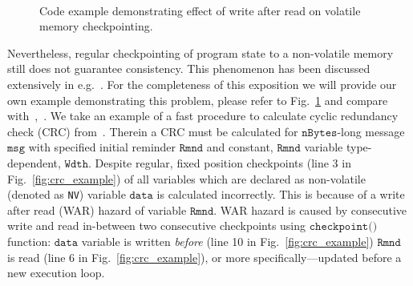 \begin{figure}
	\centering
	\\
	\caption{Code example demonstrating effect of write after read on volatile memory checkpointing.}
	\label{fig:code_demo_incosistency}
\end{figure}

Nevertheless, regular checkpointing of program state to a non-volatile memory still does not guarantee consistency. This phenomenon has been discussed extensively in e.g.~\cite{chain,alpaca}. For the completeness of this exposition we will provide our own example demonstrating this problem, please refer to Fig.~\ref{fig:code_demo_incosistency} and compare with~\cite[Sec 2.3]{alpaca},~\cite[Sec. 2.1]{chain}. We take an example of a fast procedure to calculate cyclic redundancy check (CRC) from~\cite{hicks_mibench2_2016}. Therein a CRC must be calculated for $\texttt{nBytes}$-long message $\texttt{msg}$ with specified initial reminder $\texttt{Rmnd}$ and constant, $\texttt{Rmnd}$ variable type-dependent, $\texttt{Wdth}$. Despite regular, fixed position checkpoints (line 3 in Fig.~\ref{fig:crc_example}) of all variables which are declared as non-volatile (denoted as \texttt{NV}) variable $\texttt{data}$ is calculated incorrectly. This is because of a write after read (WAR) hazard of variable $\texttt{Rmnd}$. WAR hazard is caused by consecutive write and read in-between two consecutive checkpoints using $\texttt{checkpoint()}$ function: $\texttt{data}$ variable is written \emph{before} (line 10 in Fig.~\ref{fig:crc_example}) $\texttt{Rmnd}$ is read (line 6 in Fig.~\ref{fig:crc_example}), or more specifically---updated before a new execution loop. 

